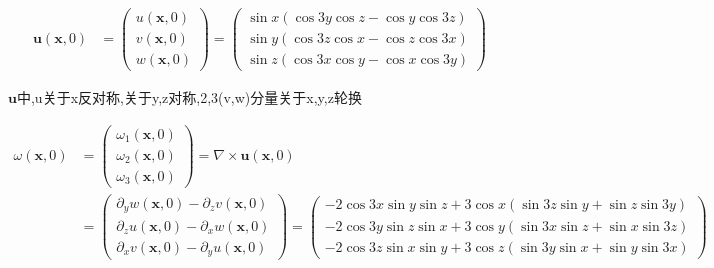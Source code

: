 \documentclass[UTF8]{ctexart}
\begin{document}
  \begin{equation*}
  \begin{split}
      \mathbf{u}(\mathbf{x},0)&= \left(\begin{matrix}
                          u(\mathbf{x},0) \\
                          v(\mathbf{x},0) \\
                          w(\mathbf{x},0)
                        \end{matrix}\right)
                     = \left(\begin{matrix}
                          \sin x(\cos 3y\cos z - \cos y \cos 3z) \\
                           \sin y(\cos 3z\cos x - \cos z \cos 3x) \\
                           \sin z(\cos 3x\cos y - \cos x \cos 3y)
                        \end{matrix}\right)
  \end{split}
  \end{equation*}

$\mathbf{u}$中,u关于x反对称,关于y,z对称,2,3(v,w)分量关于x,y,z轮换

    \begin{equation*}
  \begin{split}
      \omega(\mathbf{x},0)&= \left(\begin{matrix}
                          \omega_1(\mathbf{x},0) \\
                          \omega_2(\mathbf{x},0) \\
                          \omega_3(\mathbf{x},0)
                        \end{matrix}\right) =\nabla \times \mathbf{u}(\mathbf{x},0)  \\
                       & =\left(\begin{matrix}
                          \partial_y w(\mathbf{x},0) -\partial_z v(\mathbf{x},0) \\
                          \partial_z u(\mathbf{x},0) -\partial_x w(\mathbf{x},0) \\
                          \partial_x v(\mathbf{x},0) -\partial_y u(\mathbf{x},0)
                        \end{matrix}\right)
                          = \left(\begin{matrix}
                          -2\cos 3x\sin y\sin z + 3\cos x (\sin 3z\sin y + \sin z \sin 3y) \\
                          -2\cos 3y\sin z\sin x + 3\cos y (\sin 3x\sin z + \sin x \sin 3z) \\
                          -2\cos 3z\sin x\sin y + 3\cos z (\sin 3y\sin x + \sin y \sin 3x)
                        \end{matrix}\right)
  \end{split}
  \end{equation*}
\end{document}

